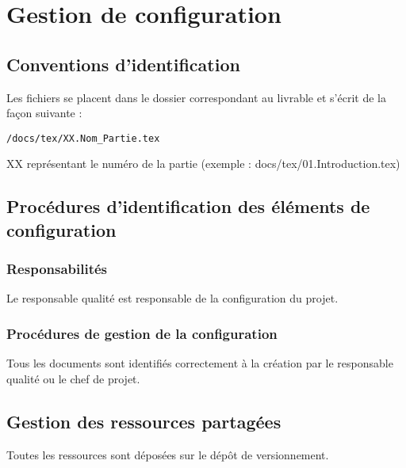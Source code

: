 \section{Gestion de configuration}

\subsection{Conventions d'identification}
Les fichiers se placent dans le dossier correspondant au livrable et s'écrit de la façon suivante : 
\begin{verbatim}/docs/tex/XX.Nom_Partie.tex\end{verbatim}
XX représentant le numéro de la partie (exemple : docs/tex/01.Introduction.tex)

\subsection{Procédures d'identification des éléments de configuration}

\subsubsection{Responsabilités}
Le responsable qualité est responsable de la configuration du projet.

\subsubsection{Procédures de gestion de la configuration}
Tous les documents sont identifiés correctement à la création par le responsable qualité ou le chef de projet.

\subsection{Gestion des ressources partagées}
Toutes les ressources sont déposées sur le dépôt de versionnement.
\pagebreak

